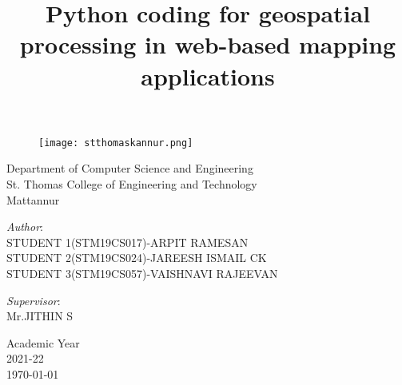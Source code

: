 \documentclass[svgnames,9pt]{beamer}
\title[Short title]{\huge \textbf{Python coding for geospatial processing in web-based mapping applications}  } %
\author[Group 14]{}
\date{}
\begin{document}
        \begin{frame}

                \begin{figure}[h!]
                        \texttt{[image: stthomaskannur.png]}
                \end{figure}

                \begin{center}     
                        \begin{minipage}[b]{1.0\textwidth}
                                \centering
                                Department of Computer Science and Engineering\\
                                St. Thomas College of Engineering and Technology\\Mattannur
                        \end{minipage}%
                \end{center}

                \titlepage

                \begin{minipage}[t]{0.5\textwidth}
                        \vspace{-3cm}
                        \begin{flushleft}
                                { \textit{Author}:\vspace*{0.2cm}\\STUDENT 1(STM19CS017)-ARPIT RAMESAN\\STUDENT 2(STM19CS024)-JAREESH ISMAIL CK\\STUDENT 3(STM19CS057)-VAISHNAVI RAJEEVAN }
                                
                        \end{flushleft}
                \end{minipage}%
                \begin{minipage}[t]{0.5\textwidth}
                        \vspace{-2cm}
                        \begin{flushright}
                                {\textit{Supervisor}:\vspace*{0.1cm} \\ Mr.JITHIN S} %
                        \end{flushright}   
                \end{minipage}%

                \vspace{-0.5cm}
                \begin{center}     
                        \begin{minipage}[b]{0.5\textwidth}
                                \centering 
                                \small Academic Year \\ 2021-22\\ \today
                        \end{minipage}%
                \end{center}   
        \end{frame}
\end{document}
